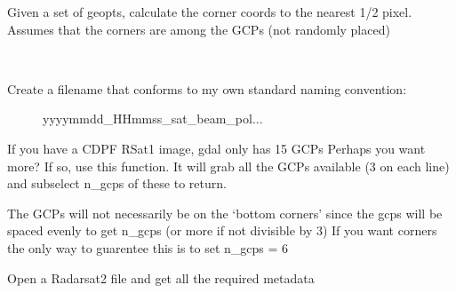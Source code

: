 \documentclass[letterpaper,10pt,english]{sphinxmanual}
\begin{document}
\begin{fulllineitems}
\begin{fulllineitems}
\label{code:Metadata.Metadata.getCornerPoints}
Given a set of geopts, calculate the corner coords to the nearest 1/2
pixel. Assumes that the corners are among the GCPs (not randomly placed)

\end{fulllineitems}


\begin{fulllineitems}
\label{code:Metadata.Metadata.getDimgname}~\begin{description}
\item[{Create a filename that conforms to my own standard naming convention:}] \leavevmode
yyyymmdd\_HHmmss\_sat\_beam\_pol...

\end{description}

\end{fulllineitems}


\begin{fulllineitems}
\label{code:Metadata.Metadata.getMoreGCPs}
If you have a CDPF RSat1 image, gdal only has 15 GCPs
Perhaps you want more?  If so, use this function.
It will grab all the GCPs available (3 on each line) and
subselect n\_gcps of these to return.

The GCPs will not necessarily be on the `bottom corners' since the gcps
will be spaced evenly to get n\_gcps (or more if not divisible by 3)
If you want corners the only way to guarentee this is to set n\_gcps = 6

\end{fulllineitems}


\begin{fulllineitems}
\label{code:Metadata.Metadata.getRS2metadata}
Open a Radarsat2 file and get all the required metadata

\end{fulllineitems}



\end{fulllineitems}
\end{document}
